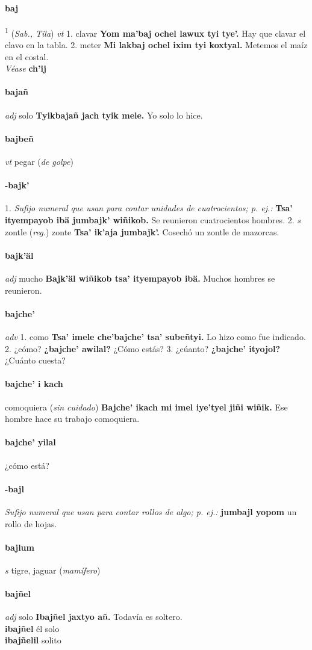 \documentclass{scrbook}
\newcommand{\entry}[1]{\paragraph{#1}}
\newcommand{\onedefinition}[1]{#1.}
\newcommand{\defsuperscript}[1]{\textsuperscript{1}}
\newcommand{\nontranslationdef}[1]{\textit{#1}}
\newcommand{\partofspeech}[1]{\textit{#1}}
\newcommand{\spanishtranslation}[1]{#1}
\newcommand{\clarification}[1]{(\textit{#1})}
\newcommand{\cholexample}[1]{\textbf{#1}}
\newcommand{\exampletranslation}[1]{#1}
\newcommand{\alsosee}[1]{\\\textit{Véase} \textbf{#1}}
\newcommand{\relevantdialect}[1]{(\textit{#1})}
\newcommand{\secondaryentry}[1]{\\\textbf{#1}}
\newcommand{\secondtranslation}[1]{#1}
\begin{document}
\begin{multicols}{2}
\entry{baj}
\defsuperscript{2}
\relevantdialect{Sab., Tila}
\partofspeech{vt}
\onedefinition{1}
\spanishtranslation{clavar}
\cholexample{Yom ma'baj ochel lawux tyi tye'.}
\exampletranslation{Hay que clavar el clavo en la tabla.}
\onedefinition{2}
\spanishtranslation{meter}
\cholexample{Mi lakbaj ochel ixim tyi koxtyal.}
\exampletranslation{Metemos el maíz en el costal.}
\alsosee{ch'ij}

\entry{bajañ}
\partofspeech{adj}
\spanishtranslation{solo}
\cholexample{Tyikbajañ jach tyik mele.}
\exampletranslation{Yo solo lo hice.}

\entry{bajbeñ}
\partofspeech{vt}
\spanishtranslation{pegar}
\clarification{de golpe}

\entry{-bajk'}
\onedefinition{1}
\nontranslationdef{Sufijo numeral que usan para contar unidades de cuatrocientos; p. ej.:}
\cholexample{Tsa' ityempayob ibä jumbajk' wiñikob.}
\exampletranslation{Se reunieron cuatrocientos hombres.}
\onedefinition{2}
\partofspeech{s}
\spanishtranslation{zontle}
\clarification{reg.}
\spanishtranslation{zonte}
\cholexample{Tsa' ik'aja jumbajk'.}
\exampletranslation{Cosechó un zontle de mazorcas.}

\entry{bajk'äl}
\partofspeech{adj}
\spanishtranslation{mucho}
\cholexample{Bajk'äl wiñikob tsa' ityempayob ibä.}
\exampletranslation{Muchos hombres se reunieron.}

\entry{bajche'}
\partofspeech{adv}
\onedefinition{1}
\spanishtranslation{como}
\cholexample{Tsa' imele che'bajche' tsa' subeñtyi.}
\exampletranslation{Lo hizo como fue indicado.}
\onedefinition{2}
\spanishtranslation{¿cómo?}
\cholexample{¿bajche' awilal?}
\exampletranslation{¿Cómo estás?}
\onedefinition{3}
\spanishtranslation{¿cúanto?}
\cholexample{¿bajche' ityojol?}
\exampletranslation{¿Cuánto cuesta?}

\entry{bajche' i kach}
\spanishtranslation{comoquiera}
\clarification{sin cuidado}
\cholexample{Bajche' ikach mi imel iye'tyel jiñi wiñik.}
\exampletranslation{Ese hombre hace su trabajo comoquiera.}

\entry{bajche' yilal}
\spanishtranslation{¿cómo está?}

\entry{-bajl}
\nontranslationdef{Sufijo numeral que usan para contar rollos de algo; p. ej.:}
\cholexample{jumbajl yopom}
\exampletranslation{un rollo de hojas.}

\entry{bajlum}
\partofspeech{s}
\spanishtranslation{tigre, jaguar}
\clarification{mamífero}

\entry{bajñel}
\partofspeech{adj}
\spanishtranslation{solo}
\cholexample{Ibajñel jaxtyo añ.}
\exampletranslation{Todavía es soltero.}
\secondaryentry{ibajñel}
\secondtranslation{él solo}
\secondaryentry{ibajñelil}
\secondtranslation{solito}


\end{multicols}
\end{document}
